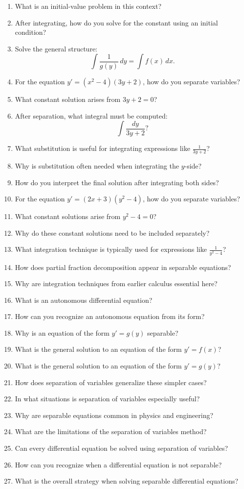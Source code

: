 \begin{enumerate}
  \item What is an initial-value problem in this context?
  \item After integrating, how do you solve for the constant using an initial condition?
  \item Solve the general structure:
    \[ \int \frac{1}{g(y)}\,dy = \int f(x)\,dx. \]
  \item For the equation \(y' = (x^{2} - 4)(3y+2)\), how do you separate variables?
  \item What constant solution arises from \(3y+2=0\)?
  \item After separation, what integral must be computed:
    \[ \int \frac{dy}{3y+2}? \]
  \item What substitution is useful for integrating expressions like \(\frac{1}{3y+2}\)?
  \item Why is substitution often needed when integrating the \(y\)-side?
  \item How do you interpret the final solution after integrating both sides?
  \item For the equation \(y' = (2x+3)(y^{2} - 4)\), how do you separate variables?
  \item What constant solutions arise from \(y^{2} - 4 = 0\)?
  \item Why do these constant solutions need to be included separately?
  \item What integration technique is typically used for expressions like \(\frac{1}{y^{2} - 4}\)?
  \item How does partial fraction decomposition appear in separable equations?
  \item Why are integration techniques from earlier calculus essential here?
  \item What is an autonomous differential equation?
  \item How can you recognize an autonomous equation from its form?
  \item Why is an equation of the form \(y' = g(y)\) separable?
  \item What is the general solution to an equation of the form \(y' = f(x)\)?
  \item What is the general solution to an equation of the form \(y' = g(y)\)?
  \item How does separation of variables generalize these simpler cases?
  \item In what situations is separation of variables especially useful?
  \item Why are separable equations common in physics and engineering?
  \item What are the limitations of the separation of variables method?
  \item Can every differential equation be solved using separation of variables?
  \item How can you recognize when a differential equation is not separable?
  \item What is the overall strategy when solving separable differential equations?
\end{enumerate}
